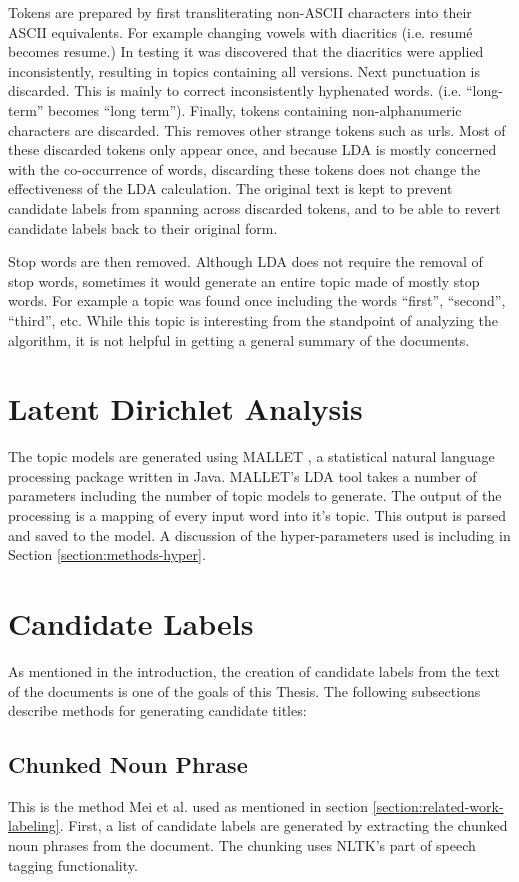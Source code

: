 Tokens are prepared by first transliterating non-ASCII characters into their ASCII equivalents. For example changing vowels with diacritics (i.e. resum\'{e} becomes resume.)  In testing it was discovered that the diacritics were applied inconsistently, resulting in topics containing all versions.  Next punctuation is discarded.  This is mainly to correct inconsistently hyphenated words. (i.e. ``long-term'' becomes ``long term'').  Finally, tokens containing non-alphanumeric characters are discarded.  This removes other strange tokens such as urls.  Most of these discarded tokens only appear once, and because LDA is mostly concerned with the co-occurrence of words, discarding these tokens does not change the effectiveness of the LDA calculation.  The original text is kept to prevent candidate labels from spanning across discarded tokens, and to be able to revert candidate labels back to their original form.

Stop words are then removed.  Although LDA does not require the removal of stop words, sometimes it would generate an entire topic made of mostly stop words.  For example a topic was found once including the words ``first'', ``second'', ``third'', etc.  While this topic is interesting from the standpoint of analyzing the algorithm, it is not helpful in getting a general summary of the documents.

\section{Latent Dirichlet Analysis}
The topic models are generated using MALLET \cite{mccallum2002mallet}, a statistical natural language processing package written in Java.  MALLET's LDA tool takes a number of parameters including the number of topic models to generate.  The output of the processing is a mapping of every input word into it's topic.  This output is parsed and saved to the model.  A discussion of the hyper-parameters used is including in Section \ref{section:methods-hyper}.

\section{Candidate Labels}
As mentioned in the introduction, the creation of candidate labels from the text of the documents is one of the goals of this Thesis.  The following subsections describe methods for generating candidate titles:

\subsection{Chunked Noun Phrase}
This is the method Mei et al. \cite{mei2007automatic} used as mentioned in section \ref{section:related-work-labeling}.  First, a list of candidate labels are generated by extracting the chunked noun phrases from the document.  The chunking uses NLTK's part of speech tagging functionality.

